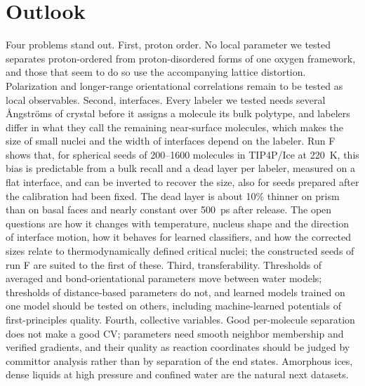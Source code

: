 \documentclass[11pt,a4paper]{article}
\begin{document}
\section{Outlook}\label{sec:outlook}
Four problems stand out. First, proton order. No local parameter we tested
separates proton-ordered from proton-disordered forms of one oxygen
framework, and those that seem to do so use the accompanying lattice
distortion. Polarization and longer-range orientational correlations remain
to be tested as local observables. Second, interfaces. Every labeler we
tested needs several \AA ngstr\"oms of crystal before it assigns a molecule
its bulk polytype, and labelers differ in what they call the remaining
near-surface molecules, which makes the size of small nuclei and the width of
interfaces depend on the labeler. Run F shows that, for spherical seeds of
200--1600 molecules in TIP4P/Ice at 220~K, this bias is predictable from a
bulk recall and a dead layer per labeler, measured on a flat interface, and
can be inverted to recover the size, also for seeds prepared after the
calibration had been fixed. The dead layer is about 10\% thinner on prism
than on basal faces and nearly constant over 500~ps after release. The open
questions are how it changes with temperature, nucleus shape and the
direction of interface motion, how it behaves for learned classifiers, and
how the corrected sizes relate to thermodynamically defined critical
nuclei; the constructed seeds of run F are suited to the first of these. Third, transferability. Thresholds of averaged and
bond-orientational parameters move between water models; thresholds of
distance-based parameters do not, and learned models trained on one model
should be tested on others, including machine-learned potentials of
first-principles quality. Fourth, collective variables. Good per-molecule
separation does not make a good CV; parameters need smooth neighbor
membership and verified gradients, and their quality as reaction coordinates
should be judged by committor analysis rather than by separation of the
end states. Amorphous ices, dense liquids at high pressure and confined water
are the natural next datasets.
\end{document}
